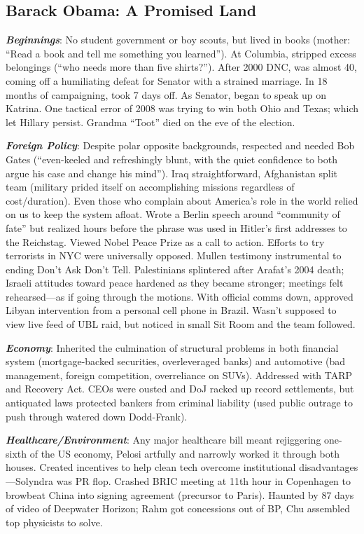 \documentclass[
]{article}
\begin{document}
\hypertarget{barack-obama-a-promised-land}{%
\subsection{Barack Obama: A Promised
Land}\label{barack-obama-a-promised-land}}

\textbf{\emph{Beginnings}}: No student government or boy scouts, but
lived in books (mother: ``Read a book and tell me something you
learned''). At Columbia, stripped excess belongings (``who needs more
than five shirts?''). After 2000 DNC, was almost 40, coming off a
humiliating defeat for Senator with a strained marriage. In 18 months of
campaigning, took 7 days off. As Senator, began to speak up on Katrina.
One tactical error of 2008 was trying to win both Ohio and Texas; which
let Hillary persist. Grandma ``Toot'' died on the eve of the election.

\textbf{\emph{Foreign Policy}}: Despite polar opposite backgrounds,
respected and needed Bob Gates (``even-keeled and refreshingly blunt,
with the quiet confidence to both argue his case and change his mind'').
Iraq straightforward, Afghanistan split team (military prided itself on
accomplishing missions regardless of cost/duration). Even those who
complain about America's role in the world relied on us to keep the
system afloat. Wrote a Berlin speech around ``community of fate'' but
realized hours before the phrase was used in Hitler's first addresses to
the Reichstag. Viewed Nobel Peace Prize as a call to action. Efforts to
try terrorists in NYC were universally opposed. Mullen testimony
instrumental to ending Don't Ask Don't Tell. Palestinians splintered
after Arafat's 2004 death; Israeli attitudes toward peace hardened as
they became stronger; meetings felt rehearsed---as if going through the
motions. With official comms down, approved Libyan intervention from a
personal cell phone in Brazil. Wasn't supposed to view live feed of UBL
raid, but noticed in small Sit Room and the team followed.

\textbf{\emph{Economy}}: Inherited the culmination of structural
problems in both financial system (mortgage-backed securities,
overleveraged banks) and automotive (bad management, foreign
competition, overreliance on SUVs). Addressed with TARP and Recovery
Act. CEOs were ousted and DoJ racked up record settlements, but
antiquated laws protected bankers from criminal liability (used public
outrage to push through watered down Dodd-Frank).

\textbf{\emph{Healthcare/Environment}}: Any major healthcare bill meant
rejiggering one-sixth of the US economy, Pelosi artfully and narrowly
worked it through both houses. Created incentives to help clean tech
overcome institutional disadvantages---Solyndra was PR flop. Crashed
BRIC meeting at 11th hour in Copenhagen to browbeat China into signing
agreement (precursor to Paris). Haunted by 87 days of video of Deepwater
Horizon; Rahm got concessions out of BP, Chu assembled top physicists to
solve.
\end{document}
